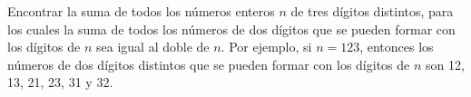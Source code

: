 Encontrar la suma de todos los números enteros $n$ de tres dígitos distintos, para los cuales la suma de todos los números de dos dígitos que se pueden formar con los dígitos de $n$ sea igual al doble de $n$. Por ejemplo, si $n = 123$, entonces los números de dos dígitos distintos que se pueden formar con los dígitos de $n$ son 12, 13, 21, 23, 31 y 32.